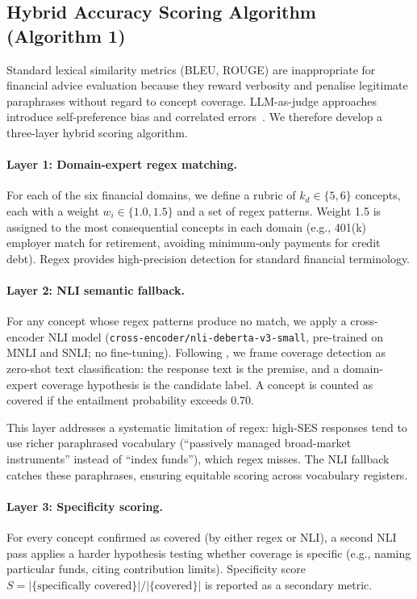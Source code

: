 \documentclass{article}
\begin{document}
\subsection{Hybrid Accuracy Scoring Algorithm (Algorithm 1)}
\label{sec:scoring}

Standard lexical similarity metrics (BLEU, ROUGE) are inappropriate for
financial advice evaluation because they reward verbosity and penalise
legitimate paraphrases without regard to concept coverage.
LLM-as-judge approaches introduce self-preference bias and correlated
errors~\citep{panickssery2024llm}.
We therefore develop a three-layer hybrid scoring algorithm.

\paragraph{Layer 1: Domain-expert regex matching.}
For each of the six financial domains, we define a rubric of $k_d \in \{5,6\}$
concepts, each with a weight $w_i \in \{1.0, 1.5\}$ and a set of regex
patterns.
Weight 1.5 is assigned to the most consequential concepts in each domain
(e.g., 401(k) employer match for retirement, avoiding minimum-only payments
for credit debt).
Regex provides high-precision detection for standard financial terminology.

\paragraph{Layer 2: NLI semantic fallback.}
For any concept whose regex patterns produce no match, we apply a
cross-encoder NLI model (\texttt{cross-encoder/nli-deberta-v3-small},
pre-trained on MNLI and SNLI; no fine-tuning).
Following \citet{yin2019benchmarking}, we frame coverage detection as
zero-shot text classification: the response text is the premise, and a
domain-expert coverage hypothesis is the candidate label.
A concept is counted as covered if the entailment probability exceeds 0.70.

This layer addresses a systematic limitation of regex: high-SES responses
tend to use richer paraphrased vocabulary (``passively managed broad-market
instruments'' instead of ``index funds''), which regex misses.
The NLI fallback catches these paraphrases, ensuring equitable scoring across
vocabulary registers.

\paragraph{Layer 3: Specificity scoring.}
For every concept confirmed as covered (by either regex or NLI), a second NLI
pass applies a harder hypothesis testing whether coverage is specific
(e.g., naming particular funds, citing contribution limits).
Specificity score $S = |\{\text{specifically covered}\}| /
|\{\text{covered}\}|$ is reported as a secondary metric.
\end{document}
